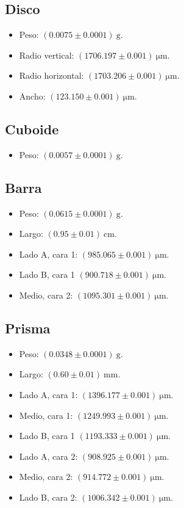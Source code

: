 \documentclass[aps,prd,a4paper,10pt, twocolumn,amsmath,showpacs,superscriptaddress,nofootinbib,preprintnumbers,notitlepage]{revtex4-2}
\begin{document}
\subsection{Disco}
\begin{itemize}
\item Peso: $(0.0075\pm0.0001)~\mathrm{g}$.
\item Radio vertical: $(1706.197\pm0.001)~\mathrm{\mu m}$.
\item Radio horizontal: $(1703.206\pm0.001)~\mathrm{\mu m}$.
\item Ancho: $(123.150\pm0.001)~\mathrm{\mu m}$.
\end{itemize}

\subsection{Cuboide}
\begin{itemize}
\item Peso: $(0.0057\pm0.0001)~\mathrm{g}$.
\end{itemize}

\subsection{Barra}
\begin{itemize}
\item Peso: $(0.0615\pm0.0001)~\mathrm{g}$.
\item Largo: $(0.95\pm0.01)~\mathrm{cm}$.
\item Lado A, cara 1: $(985.065\pm0.001)~\mathrm{\mu m}$.
\item Lado B, cara 1 $(900.718\pm0.001)~\mathrm{\mu m}$.
\item Medio, cara 2: $(1095.301\pm0.001)~\mathrm{\mu m}$.

\end{itemize}

\subsection{Prisma}
\begin{itemize}
\item Peso: $(0.0348\pm0.0001)~\mathrm{g}$.
\item Largo: $(0.60\pm0.01)~\mathrm{mm}$.
\item Lado A, cara 1: $(1396.177\pm0.001)~\mathrm{\mu m}$.
\item Medio, cara 1: $(1249.993\pm0.001)~\mathrm{\mu m}$.
\item Lado B, cara 1 $(1193.333\pm0.001)~\mathrm{\mu m}$.
\item Lado A, cara 2: $(908.925\pm0.001)~\mathrm{\mu m}$.
\item Medio, cara 2: $(914.772\pm0.001)~\mathrm{\mu m}$.
\item Lado B, cara 2: $(1006.342\pm0.001)~\mathrm{\mu m}$.
\end{itemize}
\end{document}
